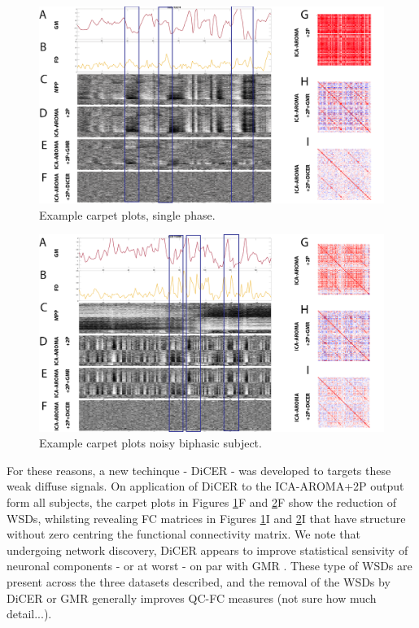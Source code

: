 \documentclass[oneside]{zHenriquesLab-StyleBioRxiv}
\begin{document}
\begin{figure}[ht!]
\includegraphics[width=1\textwidth]{figs/figure_example.png}
\caption{Example carpet plots, single phase.}\label{fig:rsfMRIexp}
\end{figure}

\begin{figure}[ht!]
\includegraphics[width=1\textwidth]{figs/figure_example2.png}
\caption{Example carpet plots noisy biphasic subject.}\label{fig:rsfMRIexpbiphasic}
\end{figure}

For these reasons, a new techinque - DiCER - was developed to targets these weak diffuse signals\cite{aquino2019identifying}. On application of DiCER to the ICA-AROMA+2P output form all subjects, the carpet plots in Figures \ref{fig:rsfMRIexp}F and \ref{fig:rsfMRIexpbiphasic}F show the reduction of WSDs, whilsting revealing FC matrices in Figures \ref{fig:rsfMRIexp}I and \ref{fig:rsfMRIexpbiphasic}I that have structure without zero centring the functional connectivity matrix. We note that undergoing network discovery, DiCER appears to improve statistical sensivity of neuronal components - or at worst - on par with GMR \cite{aquino2019identifying}. These type of WSDs are present across the three datasets described, and the removal of the WSDs by DiCER or GMR generally improves QC-FC measures (not sure how much detail...).
\end{document}
